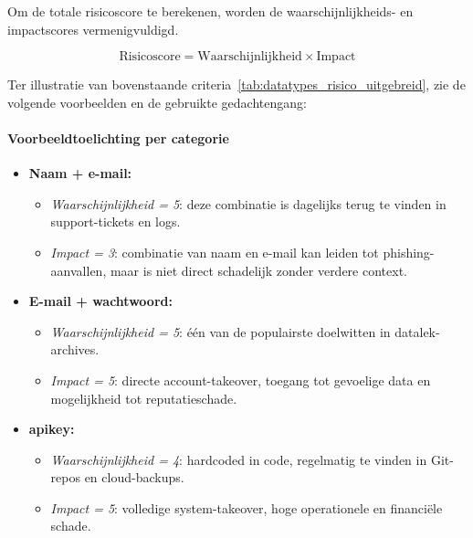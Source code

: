 Om de totale risicoscore te berekenen, worden de waarschijnlijkheids- en impactscores vermenigvuldigd.

\begin{equation}
    \text{Risicoscore} = \text{Waarschijnlijkheid} \times \text{Impact}
\end{equation}



Ter illustratie van bovenstaande criteria~\ref{tab:datatypes_risico_uitgebreid}, zie de volgende voorbeelden en de gebruikte gedachtengang:

\paragraph{Voorbeeldtoelichting per categorie}
\begin{itemize}
  \item \textbf{Naam + e-mail:}  
    \begin{itemize}
      \item \emph{Waarschijnlijkheid = 5}: deze combinatie is dagelijks terug te vinden in support-tickets en logs.
      \item \emph{Impact = 3}: combinatie van naam en e-mail kan leiden tot phishing-aanvallen, maar is niet direct schadelijk zonder verdere context.
    \end{itemize}
  \item \textbf{E-mail + wachtwoord:}
    \begin{itemize}
      \item \emph{Waarschijnlijkheid = 5}: één van de populairste doelwitten in datalek-archives.
      \item \emph{Impact = 5}: directe account-takeover, toegang tot gevoelige data en mogelijkheid tot reputatieschade.
    \end{itemize}
  \item \textbf{\gls{apikey}:}
    \begin{itemize}
      \item \emph{Waarschijnlijkheid = 4}: hardcoded in code, regelmatig te vinden in Git-repos en cloud-backups.
      \item \emph{Impact = 5}: volledige system-takeover, hoge operationele en financiële schade.
    \end{itemize}
\end{itemize}


